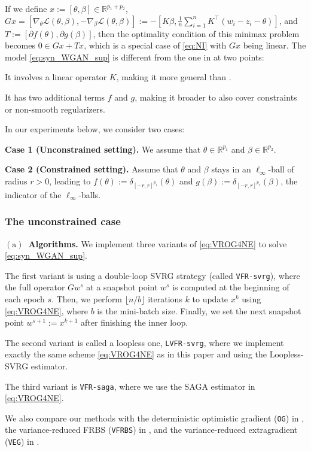 \documentclass{article}
\newcommand{\R}{\mathbb{R}}
\newcommand{\Lc}{\mathcal{L}}
\newcommand{\beforesubsubsec}{\vspace{-1.5ex}}
\newcommand{\aftersubsubsec}{\vspace{-1.5ex}}
\theoremstyle{plain}
\theoremstyle{definition}
\theoremstyle{remark}
\begin{document}
If we define $x := [\theta,\beta] \in \R^{p_1+p_2}$, $Gx = [\nabla_{\theta}\Lc(\theta,\beta), -\nabla_{\beta}\Lc(\theta,\beta)] := -[K\beta, \frac{1}{n}\sum_{i=1}^nK^{\top}(w_i - z_i - \theta)]$, and $T := [\partial{f}(\theta), \partial{g}(\beta)]$, then the optimality condition of this minimax problem becomes $0 \in Gx + Tx$, which is a special case of \eqref{eq:NI} with $Gx$ being linear.
The model \eqref{eq:syn_WGAN_sup} is different from the one in \citep{daskalakis2018training} at two points:
\begin{compactitem}
\item It involves a linear operator $K$, making it more general than \citep{daskalakis2018training}.
\item It has two additional terms $f$ and $g$, making it broader to also cover constraints or non-smooth regularizers. 
\end{compactitem}
In our experiments below, we consider two cases:
\begin{compactitem}
\item \textbf{Case 1 (Unconstrained setting).} We assume that $\theta \in \R^{p_1}$ and $\beta \in \R^{p_2}$.
\item \textbf{Case 2 (Constrained setting).} Assume that $\theta$ and $\beta$ stays in an $\ell_{\infty}$-ball of radius $r > 0$, leading to $f(\theta) := \delta_{[-r,r]^{p_1}}(\theta)$ and $g(\beta) := \delta_{[-r, r]^{p_2}}(\beta)$, the indicator of the $\ell_{\infty}$-balls.
\end{compactitem}

\beforesubsubsec
\subsubsection{The unconstrained case}\label{apdx:subsec:synWGAN_unconstr_case}
\aftersubsubsec
\textbf{$\mathrm{(a)}$~Algorithms.}
We implement three variants of \eqref{eq:VROG4NE} to solve \eqref{eq:syn_WGAN_sup}.
\begin{compactitem}
\item The first variant is using a double-loop SVRG strategy (called \texttt{VFR-svrg}), where the full operator $Gw^s$ at a snapshot point $w^s$ is computed at the beginning of each epoch $s$.
Then, we perform $\lfloor n/b \rfloor$ iterations $k$ to update $x^k$ using \eqref{eq:VROG4NE}, where $b$ is the mini-batch size.
Finally, we set the next snapshot point $w^{s+1} := x^{k+1}$ after finishing the inner loop.
\item The second variant is called a loopless one, \texttt{LVFR-svrg}, where we implement exactly the same scheme \eqref{eq:VROG4NE} as in this paper and using the Loopless-SVRG estimator.
\item The third variant is \texttt{VFR-saga}, where we use the SAGA estimator in \eqref{eq:VROG4NE}.
\end{compactitem}
We also compare our methods with the deterministic optimistic gradient (\texttt{OG}) in \citep{daskalakis2018training}, the variance-reduced FRBS (\texttt{VFRBS}) in \citep{alacaoglu2022beyond}, and the variance-reduced extragradient (\texttt{VEG}) in \citep{alacaoglu2021stochastic}.
\end{document}
